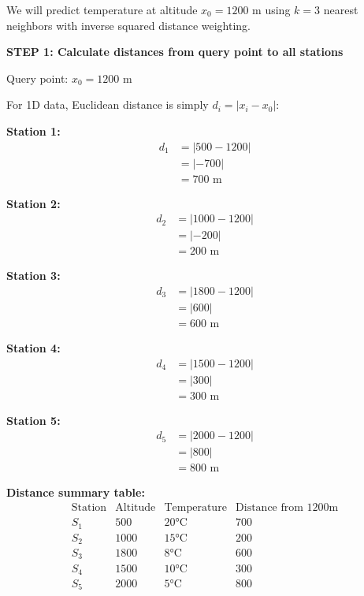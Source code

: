 \documentclass[12pt]{article}
\begin{document}
\begin{solution}
We will predict temperature at altitude \(x_0 = 1200\) m using \(k=3\) nearest neighbors with inverse squared distance weighting.

\textbf{STEP 1: Calculate distances from query point to all stations}

Query point: \(x_0 = 1200\) m

For 1D data, Euclidean distance is simply \(d_i = |x_i - x_0|\):

\textbf{Station 1:}
\begin{align*}
d_1 &= |500 - 1200| \\
&= |-700| \\
&= \boxed{700 \text{ m}}
\end{align*}

\textbf{Station 2:}
\begin{align*}
d_2 &= |1000 - 1200| \\
&= |-200| \\
&= \boxed{200 \text{ m}}
\end{align*}

\textbf{Station 3:}
\begin{align*}
d_3 &= |1800 - 1200| \\
&= |600| \\
&= \boxed{600 \text{ m}}
\end{align*}

\textbf{Station 4:}
\begin{align*}
d_4 &= |1500 - 1200| \\
&= |300| \\
&= \boxed{300 \text{ m}}
\end{align*}

\textbf{Station 5:}
\begin{align*}
d_5 &= |2000 - 1200| \\
&= |800| \\
&= \boxed{800 \text{ m}}
\end{align*}

\textbf{Distance summary table:}
\[
\begin{array}{c|c|c|c}
\text{Station} & \text{Altitude} & \text{Temperature} & \text{Distance from 1200m} \\
\hline
S_1 & 500 & 20°\text{C} & 700 \\
S_2 & 1000 & 15°\text{C} & 200 \\
S_3 & 1800 & 8°\text{C} & 600 \\
S_4 & 1500 & 10°\text{C} & 300 \\
S_5 & 2000 & 5°\text{C} & 800 \\
\end{array}
\]


\end{solution}
\end{document}
